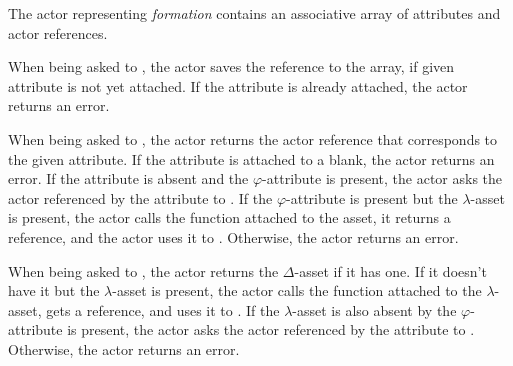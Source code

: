 The actor representing \emph{formation} contains an associative array of attributes and actor references.

When being asked to , the actor saves the reference to the array, if given attribute is not yet attached.
If the attribute is already attached, the actor returns an error.

When being asked to , the actor returns the actor reference that corresponds to the given attribute.
If the attribute is attached to a blank, the actor returns an error.
If the attribute is absent and the \(\varphi\)-attribute is present, the actor asks the actor referenced by the attribute to .
If the \(\varphi\)-attribute is present but the \(\lambda\)-asset is present, the actor calls the function attached to the asset, it returns a reference, and the actor uses it to .
Otherwise, the actor returns an error.

When being asked to , the actor returns the \(\Delta\)-asset if it has one.
If it doesn't have it but the \(\lambda\)-asset is present, the actor calls the function attached to the \(\lambda\)-asset, gets a reference, and uses it to .
If the \(\lambda\)-asset is also absent by the \(\varphi\)-attribute is present, the actor asks the actor referenced by the attribute to .
Otherwise, the actor returns an error.
